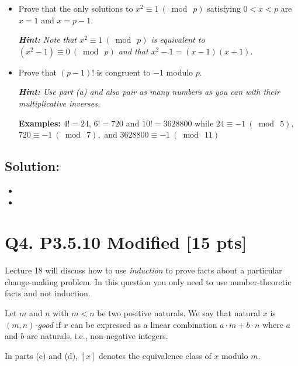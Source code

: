 \documentclass[12pt]{article}
\begin{document}
\begin{itemize}
\item [(a)] Prove that the only solutions to $x^2 \equiv 1\  (\bmod \ p)$ satisfying $ 0 < x < p$ are $x=1$ and $x=p-1.$

{\em \small {\bf Hint:}
Note that $x^2 \equiv 1 \ (\bmod \ p)$ is equivalent to $(x^2-1) \equiv 0\  (\bmod \ p)$  and that 
$x^2 -1 = (x-1) (x+1).$
}


 \item [(b)] Prove that $(p - 1)!$ is congruent to $-1$ modulo $p$. 

 {\em \small {\bf Hint:} Use part (a) and also pair as many numbers as you can with their multiplicative inverses.

 {\bf Examples:} $4!=24$, $6!=720$ and $10!=3628800$  while 
 $24 \equiv -1 \ (\bmod\  5),$
  $720 \equiv -1 \ (\bmod \ 7),$ and
   $3628800 \equiv -1 \ (\bmod \ 11)$ 
 
 
}

\end{itemize}




\subsection*{\textbf{Solution:}}


\begin{itemize}
\item [(a)] 

 \item [(b)]  
\end{itemize}

\newpage
\section*{\textbf{Q4. P3.5.10 Modified} [15 pts]}
Lecture 18 will discuss how to use {\em induction} to prove facts about a particular change-making problem.  In this question 
you only need to use number-theoretic   facts and not induction.

Let $m$ and $n$ with $m < n$ be two positive naturals. We say that  natural $x$ is {\em $(m,n)$-good}  if $x$ can be 
expressed as  a linear combination  $a \cdot m + b \cdot  n$  where $a$ and $b$ are naturals, i.e., non-negative integers.

In parts (c) and (d), $[x]$ denotes the equivalence class of $x$ modulo $m.$
\end{document}
